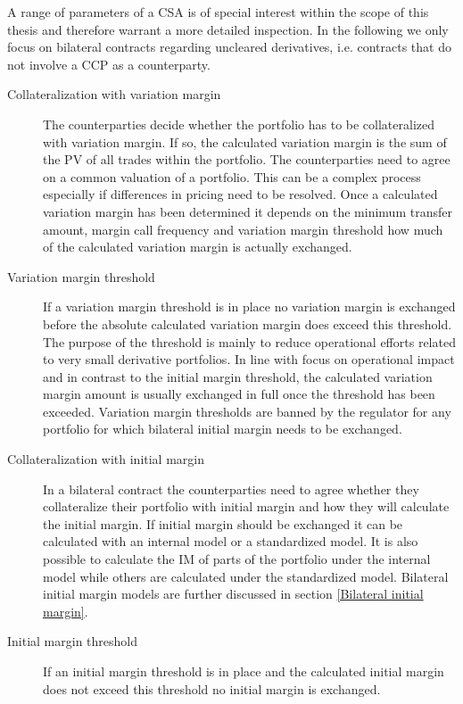 \documentclass[../Thesis_AHoecherl.tex]{subfiles}
\begin{document}
A range of parameters of a CSA is of special interest within the scope of this thesis and therefore warrant a more detailed inspection. 
In the following we only focus on bilateral contracts regarding uncleared derivatives, i.e. contracts that do not involve a \gls{CCP} as a counterparty.

\begin{description}
    \item[Collateralization with variation margin]
    The counterparties decide whether the portfolio has to be collateralized with variation margin.
    If so, the calculated variation margin is the sum of the \gls{PV} of all trades within the portfolio.
    The counterparties need to agree on a common valuation of a portfolio. This can be a complex process especially if differences in pricing need to be resolved.
    Once a calculated variation margin has been determined it depends on the minimum transfer amount, margin call frequency and variation margin threshold how much of the calculated variation margin is actually exchanged. 
    \item[Variation margin threshold]
    If a variation margin threshold is in place no variation margin is exchanged before the absolute calculated variation margin does exceed this threshold.
    The purpose of the threshold is mainly to reduce operational efforts related to very small derivative portfolios. In line with focus on operational impact and in contrast to the initial margin threshold, the calculated variation margin amount is usually exchanged in full once the threshold has been exceeded.
    Variation margin thresholds are banned by the regulator for any portfolio for which bilateral initial margin needs to be exchanged.  
    \item[Collateralization with initial margin]
    In a bilateral contract the counterparties need to agree whether they collateralize their portfolio with initial margin and how they will calculate the initial margin.
    If initial margin should be exchanged it can be calculated with an internal model or a standardized model. It is also possible to calculate the IM of parts of the portfolio under the internal model while others are calculated under the standardized model.
    Bilateral initial margin models are further discussed in section \ref{Bilateral initial margin}.
    \item[Initial margin threshold]
    If an initial margin threshold is in place and the calculated initial margin does not exceed this threshold no initial margin is exchanged.

\end{description}
\end{document}
